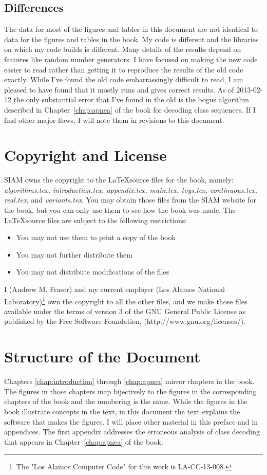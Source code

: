 \documentclass[prelim,showlabels]{book}
\begin{document}
\subsection*{Differences}
The data for most of the figures and tables in this document are not
identical to data for the figures and tables in the book.  My code is
different and the libraries on which my code builds is different.
Many details of the results depend on features like random number
generators.  I have focused on making the new code easier to read
rather than getting it to reproduce the results of the old code
exactly.  While I've found the old code embarrassingly difficult to
read, I am pleased to have found that it mostly runs and gives correct
results.  As of 2013-02-12 the only substantial error that I've found
in the old is the bogus algorithm described in
Chapter~\ref{chap:apnea} of the book for decoding class sequences.  If
I find other major flaws, I will note them in revisions to this
document.

\section*{Copyright and License}

SIAM owns the copyright to the \LaTeX source files for the book,
namely: \emph{algorithms.tex, introduction.tex, appendix.tex,
  main.tex, toys.tex, continuous.tex, real.tex,} and
\emph{variants.tex}.  You may obtain those files from the SIAM website
for the book, but you can only use them to see how the book
was made.  The \LaTeX source files are subject to the following
restrictions:
\begin{itemize}
\item You may not use them to print a copy of the book
\item You may not further distribute them
\item You may not distribute modifications of the files
\end{itemize}

I (Andrew M. Fraser) and my current employer (Los Alamos National
Laboratory)\footnote{The "Los Alamos Computer Code" for this work is
  LA-CC-13-008.} own the copyright to all the other files, and we make
those files available under the terms of version 3 of the GNU General
Public License as published by the Free Software Foundation,
(http://www.gnu.org/licenses/).

\section*{Structure of the Document}
Chapters \ref{chap:introduction} through \ref{chap:apnea} mirror
chapters in the book.  The figures in those chapters map bijectively
to the figures in the corresponding chapters of the book and the
numbering is the same.  While the figures in the book illustrate
concepts in the text, in this document the text explains the software
that makes the figures.  I will place other material in this preface
and in appendices.  The first appendix addresses the erroneous analysis
of class decoding that appears in Chapter~\ref{chap:apnea} of the
book.
\end{document}
